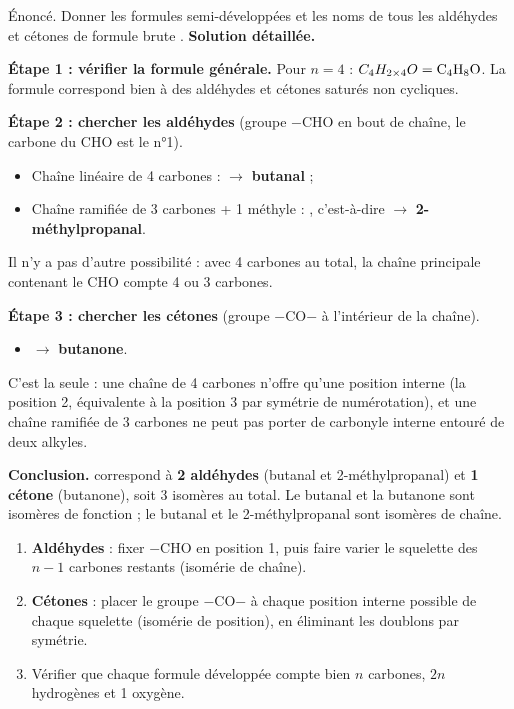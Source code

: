\documentclass[11pt]{article}
\begin{document}
\begin{exoresolu}
Énoncé. Donner les formules semi-développées et les noms de tous les aldéhydes et cétones de formule brute .
\tcblower
\textbf{Solution détaillée.}

\textbf{Étape 1 : vérifier la formule générale.} Pour $n = 4$ : $C_4H_{2\times 4}O = \ce{C4H8O}$. La formule correspond bien à des aldéhydes et cétones saturés non cycliques.

\textbf{Étape 2 : chercher les aldéhydes} (groupe $-$CHO en bout de chaîne, le carbone du CHO est le n°1).
\begin{itemize}
\item Chaîne linéaire de 4 carbones :  $\rightarrow$ \textbf{butanal} ;
\item Chaîne ramifiée de 3 carbones + 1 méthyle : , c'est-à-dire  $\rightarrow$ \textbf{2-méthylpropanal}.
\end{itemize}
Il n'y a pas d'autre possibilité : avec 4 carbones au total, la chaîne principale contenant le CHO compte 4 ou 3 carbones.

\textbf{Étape 3 : chercher les cétones} (groupe $-$CO$-$ à l'intérieur de la chaîne).
\begin{itemize}
\item {} $\rightarrow$ \textbf{butanone}.
\end{itemize}
C'est la seule : une chaîne de 4 carbones n'offre qu'une position interne (la position 2, équivalente à la position 3 par symétrie de numérotation), et une chaîne ramifiée de 3 carbones ne peut pas porter de carbonyle interne entouré de deux alkyles.

\textbf{Conclusion.}  correspond à \textbf{2 aldéhydes} (butanal et 2-méthylpropanal) et \textbf{1 cétone} (butanone), soit 3 isomères au total. Le butanal et la butanone sont isomères de fonction ; le butanal et le 2-méthylpropanal sont isomères de chaîne.
\end{exoresolu}

\begin{methode}
\begin{enumerate}
\item \textbf{Aldéhydes} : fixer $-$CHO en position 1, puis faire varier le squelette des $n-1$ carbones restants (isomérie de chaîne).
\item \textbf{Cétones} : placer le groupe $-$CO$-$ à chaque position interne possible de chaque squelette (isomérie de position), en éliminant les doublons par symétrie.
\item Vérifier que chaque formule développée compte bien $n$ carbones, $2n$ hydrogènes et 1 oxygène.
\end{enumerate}
\end{methode}
\end{document}
